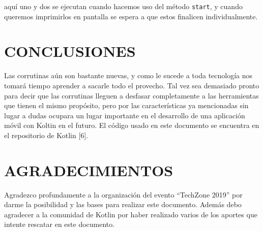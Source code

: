 \documentclass[twocolumn,10pt,abstract=on]{asme2ej}
\begin{document}
aquí uno y dos se ejecutan cuando hacemos uso del método \verb+start+, y cuando queremos imprimirlos en pantalla se espera a que estos finalicen individualmente.


\section{CONCLUSIONES}
Las corrutinas aún son bastante nuevas, y como le sucede a toda tecnología nos tomará tiempo aprender a sacarle todo el provecho.
\smallbreak
Tal vez sea demasiado pronto para decir que las corrutinas lleguen a desfasar completamente a las herramientas que tienen el mismo propósito, pero por las características ya mencionadas sin lugar a dudas ocupara un lugar importante en el desarrollo de una aplicación móvil con Koltin en el futuro.
\smallbreak
El código usado en este documento se encuentra en el repositorio de Kotlin [6].




\section{AGRADECIMIENTOS}
Agradezco profundamente a la organización del evento “TechZone 2019” por darme la posibilidad y las bases para realizar este documento. Además debo agradecer a la comunidad de Kotlin por haber realizado varios de los aportes que intente rescatar en este documento.


%





\end{document}
